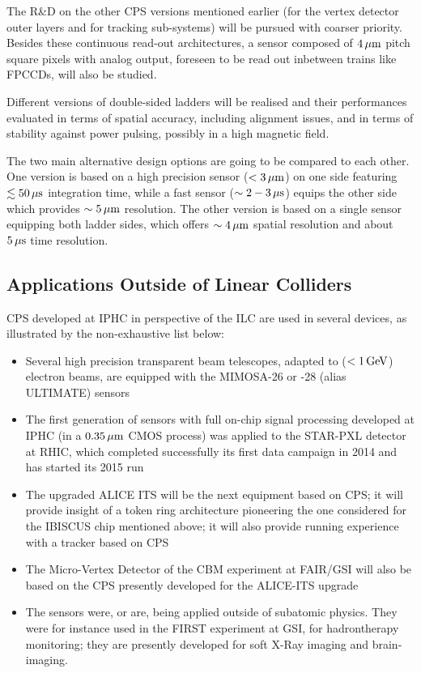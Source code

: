 The R\&D on the other CPS versions mentioned earlier (for the vertex
detector outer layers and for tracking sub-systems) will be pursued
with coarser priority.
Besides these continuous read-out architectures, a sensor composed
of $\unit[4]{\mu m}$ pitch square pixels with analog output, foreseen to be
read out inbetween trains like FPCCDs, will also be studied.


Different versions of double-sided ladders will be realised and
their performances evaluated in terms of spatial accuracy, including
alignment issues, and in terms of stability against power pulsing,
possibly in a high magnetic field.

The two main alternative design options are going to be compared
to each other. One version is based on a high precision sensor
($<\unit[3]{\mu m}$) on one side featuring $\lesssim\unit[50]{\mu s}$ integration
time, while a fast sensor ($\sim\unit[2-3]{\mu s}$) equips the other side
which provides $\sim\unit[5]{\mu m}$ resolution. The other version is based
on a single sensor equipping both ladder sides, which offers $\sim\unit[4]{\mu m}$
spatial resolution and about $\unit[5]{\mu s}$ time resolution.

\subsection{Applications Outside of Linear Colliders}
CPS developed at IPHC in perspective of the ILC are used in several
devices, as illustrated by the non-exhaustive list below:
\begin{itemize}
\item Several high precision transparent beam telescopes, adapted to
	($<\unit[1]{GeV}$) electron beams, are equipped with the MIMOSA-26 or
	-28 (alias ULTIMATE) sensors
\item The first generation of sensors with full on-chip signal processing
	developed at IPHC (in a $\unit[0.35]{\mu m}$ CMOS process) was applied to the
	STAR-PXL detector at RHIC, which completed successfully its first
	data campaign in 2014 and has started its 2015 run
\item The upgraded ALICE ITS will be the next equipment based on CPS;
	it will provide insight of a token ring architecture pioneering
	the one considered for the IBISCUS chip mentioned above; it will
	also provide running experience with a tracker based on CPS
\item The Micro-Vertex Detector of the CBM experiment at FAIR/GSI will
	also be based on the CPS presently developed for the ALICE-ITS
	upgrade
\item The sensors were, or are, being applied outside of subatomic physics.
	They were for instance used in the FIRST experiment at GSI, for
	hadrontherapy monitoring; they are presently developed for soft
	X-Ray imaging and brain-imaging.
\end{itemize}

